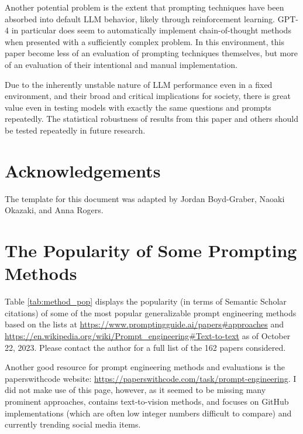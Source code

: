 \documentclass[11pt]{article}
\begin{document}
Another potential problem is the extent that prompting techniques have been absorbed into default LLM behavior, likely through reinforcement learning. GPT-4 in particular does seem to automatically implement chain-of-thought methods when presented with a sufficiently complex problem. In this environment, this paper become less of an evaluation of prompting techniques themselves, but more of an evaluation of their intentional and manual implementation.

Due to the inherently unstable nature of LLM performance even in a fixed environment, and their broad and critical implications for society, there is great value even in testing models with exactly the same questions and prompts repeatedly. The statistical robustness of results from this paper and others should be tested repeatedly in future research.

\section*{Acknowledgements}
The template for this document was adapted by Jordan Boyd-Graber, Naoaki Okazaki, and Anna Rogers.




\clearpage
\newpage

\onecolumn
\setlength{\parindent}{0cm}
\setlength\parskip{1em plus 0.1em minus 0.2em}
\appendix

\section{The Popularity of Some Prompting Methods}
\label{sec:popularity}

Table \ref{tab:method_pop} displays the popularity (in terms of Semantic Scholar citations) of some of the most popular generalizable prompt engineering methods based on the lists at \url{https://www.promptingguide.ai/papers#approaches} and \url{https://en.wikipedia.org/wiki/Prompt_engineering#Text-to-text} as of October 22, 2023. Please contact the author for a full list of the 162 papers considered.

Another good resource for prompt engineering methods and evaluations is the paperswithcode website: \url{https://paperswithcode.com/task/prompt-engineering}. I did not make use of this page, however, as it seemed to be missing many prominent approaches, contains text-to-vision methods, and focuses on GitHub implementations (which are often low integer numbers difficult to compare) and currently trending social media items.
\end{document}

